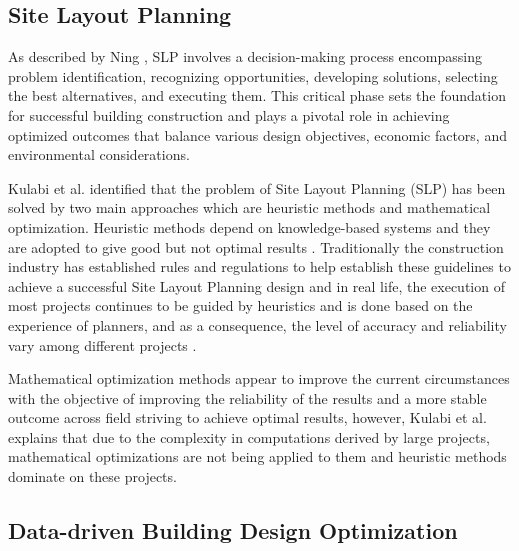 \subsection{Site Layout Planning}
\label{subsec:SLP}
As described by Ning \cite{Ning2011}, SLP involves a decision-making process encompassing problem identification, recognizing opportunities, developing solutions, selecting the best alternatives, and executing them. This critical phase sets the foundation for successful building construction and plays a pivotal role in achieving optimized outcomes that balance various design objectives, economic factors, and environmental considerations.

Kulabi et al. \cite{Kulabi2020} identified that the problem of Site Layout Planning (SLP) has been solved by two main approaches which are heuristic methods and mathematical optimization. 
Heuristic methods depend on knowledge-based systems and they are adopted to give good but not optimal results \cite{Kulabi2020}. Traditionally the construction industry has established rules and regulations to help establish these guidelines to achieve a successful Site Layout Planning design and in real life, the execution of most projects continues to be guided by heuristics   \cite{Augenbroe2012} and is done based on the experience of planners, and as a consequence, the level of accuracy and reliability vary among different projects \cite{Yi2018}.

Mathematical optimization methods appear to improve the current circumstances with the objective of improving the reliability of the results and a more stable outcome across field striving to achieve optimal results, however, Kulabi et al. \cite{Kulabi2020} explains that due to the complexity in computations derived by large projects, mathematical optimizations are not being applied to them and heuristic methods dominate on these projects. 

\subsection{Data-driven Building Design Optimization}
\label{subsec:PBD}

